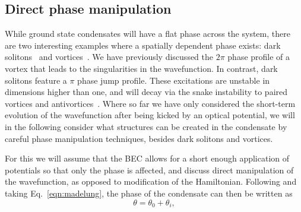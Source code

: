 \subsection{Direct phase manipulation}\label{sec:phase}

While ground state condensates will have a flat phase across the system, there are two interesting examples where a spatially dependent phase exists: dark solitons~\cite{BEC:Denschlag_science_2000} and vortices~\cite{Vtx:Dobrek_pra_1999}. We have previously discussed the $2\pi$ phase profile of a vortex that leads to the singularities in the wavefunction. In contrast, dark solitons feature a $\pi$ phase jump profile. These excitations are unstable in dimensions higher than one, and will decay via the snake instability to paired vortices and antivortices~\cite{BEC:Brand_pra_2002}. Where so far we have only considered the short-term evolution of the wavefunction after being kicked by an optical potential, we will in the following consider what structures can be created in the condensate by careful phase manipulation techniques, besides dark solitons and vortices.

For this we will assume that the BEC allows for a short enough application of potentials so that only the phase is affected, and discuss direct manipulation of the wavefunction, as opposed to modification of the Hamiltonian. Following \cite{BK:Pitaevskii_Stringari_2003} and taking Eq.~\eqref{eqn:madelung}, the phase of the condensate can then be written as
\begin{equation}
\theta = \theta_0 + \theta_i,
\end{equation}

